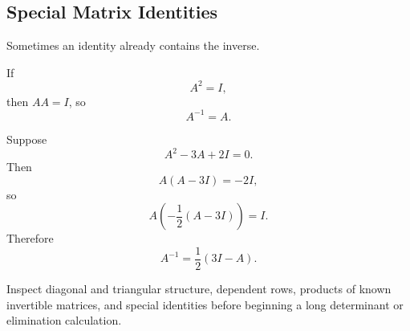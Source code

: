 \subsection{Special Matrix Identities}

Sometimes an identity already contains the inverse.

\begin{examplebox}[An involution]
If
\[
A^2=I,
\]
then $AA=I$, so
\[
\boxed{A^{-1}=A}.
\]
\end{examplebox}

\begin{examplebox}
Suppose
\[
A^2-3A+2I=0.
\]
Then
\[
A(A-3I)=-2I,
\]
so
\[
A\left(-\frac12(A-3I)\right)=I.
\]
Therefore
\[
\boxed{A^{-1}=\frac12(3I-A)}.
\]
\end{examplebox}

\begin{summarybox}
Inspect diagonal and triangular structure, dependent rows, products of known invertible matrices, and special identities before beginning a long determinant or elimination calculation.
\end{summarybox}
